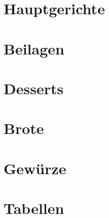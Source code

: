 \documentclass{book}
\begin{document}
 
\tableofcontents
\chapter{Hauptgerichte} 
\chapter{Beilagen} 
\chapter{Desserts} 
\chapter{Brote} 
\chapter{Gewürze} 
\chapter{Tabellen} 
\end{document}
